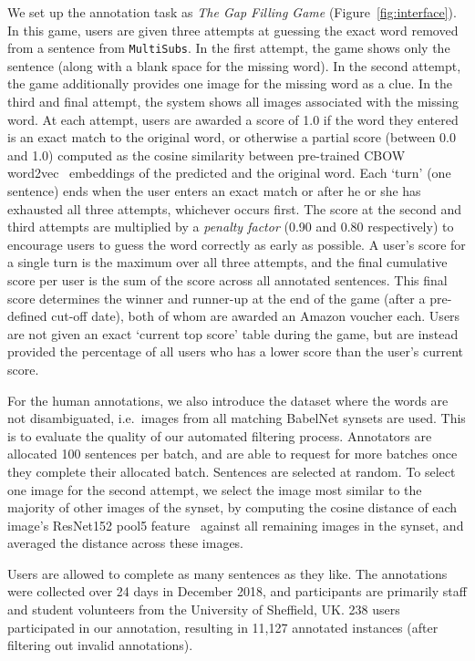 \documentclass[twocolumn]{svjour3}          \smartqed  \usepackage{graphicx}
\newcommand{\multisubs}{\texttt{MultiSubs}\xspace}
\begin{document}
We set up the annotation task as \textit{The Gap Filling Game} (Figure~\ref{fig:interface}). In this game, users are given three attempts at guessing the exact word removed from a sentence from \multisubs. In the first attempt, the game shows only the sentence (along with a blank space for the missing word). In the second attempt, the game additionally provides one image for the missing word as a clue. In the third and final attempt, the system shows all images associated with the missing word. At each attempt, users are awarded a score of 1.0 if the word they entered is an exact match to the original word, or otherwise a partial score (between 0.0 and 1.0) computed as the cosine similarity between pre-trained CBOW word2vec~\cite{MikolovEtAl:2013} embeddings of the predicted and the original word. Each `turn' (one sentence) ends when the user enters an exact match or after he or she has exhausted all three attempts, whichever occurs first. The score at the second and third attempts are multiplied by a \emph{penalty factor} (0.90 and 0.80 respectively) to encourage users to guess the word correctly as early as possible. A user's score for a single turn is the maximum over all three attempts, and the final cumulative score per user is the sum of the score across all annotated sentences. This final score determines the winner and runner-up at the end of the game (after a pre-defined cut-off date), both of whom are awarded an Amazon voucher each. Users are not given an exact `current top score' table during the game, but are instead provided the percentage of all users who has a lower score than the user's current score.

For the human annotations, we also introduce the \textbf{} dataset where the words are not disambiguated, i.e.\ images from all matching BabelNet synsets are used. This is to evaluate the quality of our automated filtering process. Annotators are allocated 100 sentences per batch, and are able to request for more batches once they complete their allocated batch. Sentences are selected at random. To select one image for the second attempt, we select the image most similar to the majority of other images of the synset, by computing the cosine distance of each image's ResNet152 pool5 feature~\cite{HeEtAl:2016} against all remaining images in the synset, and averaged the distance across these images. 

Users are allowed to complete as many sentences as they like. The annotations were collected over 24 days in December 2018, and participants are primarily staff and student volunteers from the University of Sheffield, UK. 238 users participated in our annotation, resulting in 11,127 annotated instances (after filtering out invalid annotations).
\end{document}
